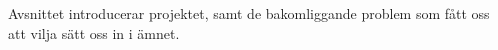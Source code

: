 \textcolor{lila}{Avsnittet introducerar projektet, samt de bakomliggande problem som fått oss att vilja sätt oss in i ämnet.}